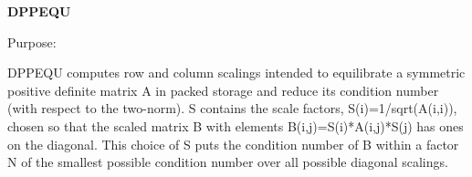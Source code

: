 {\bfseries D\+P\+P\+E\+Q\+U} 

 \begin{DoxyParagraph}{Purpose\+: }
\begin{DoxyVerb} DPPEQU computes row and column scalings intended to equilibrate a
 symmetric positive definite matrix A in packed storage and reduce
 its condition number (with respect to the two-norm).  S contains the
 scale factors, S(i)=1/sqrt(A(i,i)), chosen so that the scaled matrix
 B with elements B(i,j)=S(i)*A(i,j)*S(j) has ones on the diagonal.
 This choice of S puts the condition number of B within a factor N of
 the smallest possible condition number over all possible diagonal
 scalings.\end{DoxyVerb}
 
\end{DoxyParagraph}

